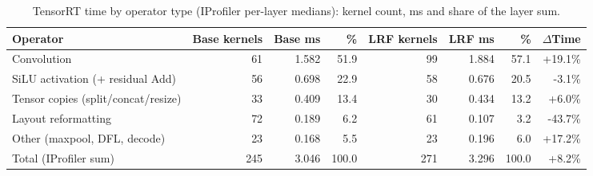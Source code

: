 \begin{table}[t]
\centering
\caption{TensorRT time by operator type (IProfiler per-layer medians): kernel count, ms and share of the layer sum.}
\label{tab:lrf_breakdown}
\begin{tabular}{lrrrrrrr}
\toprule
Operator & Base kernels & Base ms & \% & LRF kernels & LRF ms & \% & $\Delta$Time \\
\midrule
Convolution & 61 & 1.582 & 51.9 & 99 & 1.884 & 57.1 & +19.1\% \\
SiLU activation (+ residual Add) & 56 & 0.698 & 22.9 & 58 & 0.676 & 20.5 & -3.1\% \\
Tensor copies (split/concat/resize) & 33 & 0.409 & 13.4 & 30 & 0.434 & 13.2 & +6.0\% \\
Layout reformatting & 72 & 0.189 & 6.2 & 61 & 0.107 & 3.2 & -43.7\% \\
Other (maxpool, DFL, decode) & 23 & 0.168 & 5.5 & 23 & 0.196 & 6.0 & +17.2\% \\
\midrule
Total (IProfiler sum) & 245 & 3.046 & 100.0 & 271 & 3.296 & 100.0 & +8.2\% \\
\bottomrule
\end{tabular}
\end{table}
